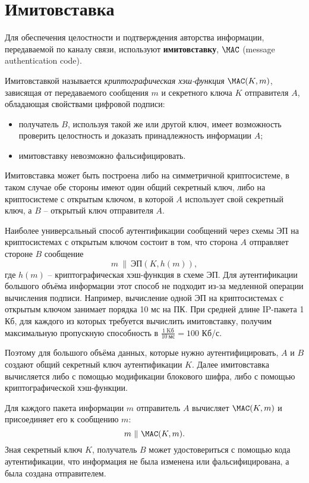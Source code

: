 \section{Имитовставка}\label{section-MAC}

Для обеспечения целостности и подтверждения авторства информации, передаваемой по каналу связи, используют \textbf{имитовставку}, $\MAC$ (message authentication code).

Имитовставкой называется \emph{криптографическая хэш-функция} $\MAC(K,m)$, зависящая от передаваемого сообщения $m$ и секретного ключа $K$ отправителя $A$, обладающая свойствами цифровой подписи:
\begin{itemize}
    \item получатель $B$, используя такой же или другой ключ, имеет возможность проверить целостность и доказать принадлежность информации $A$;
    \item имитовставку невозможно фальсифицировать.
\end{itemize}

Имитовставка может быть построена либо на симметричной криптосистеме, в таком случае обе стороны имеют один общий секретный ключ, либо на криптосистеме с открытым ключом, в которой $A$ использует свой секретный ключ, а $B$ -- открытый ключ отправителя $A$.

Наиболее универсальный способ аутентификации сообщений через схемы ЭП на криптосистемах с открытым ключом состоит в том, что сторона $A$ отправляет стороне $B$ сообщение
    \[ m ~\|~ \textrm{ЭП}(K, h(m)), \]
где $h(m)$ -- криптографическая хэш-функция в схеме ЭП. Для аутентификации большого объёма информации этот способ не подходит из-за медленной операции вычисления подписи. Например, вычисление одной ЭП на криптосистемах с открытым ключом занимает порядка 10 мс на ПК. При средней длине IP-пакета 1 Кб, для каждого из которых требуется вычислить имитовставку, получим максимальную пропускную способность в $\frac{1 ~ \text{Kб}}{10 ~ \text{мс}} = 100$ Кб/с.

Поэтому для большого объёма данных, которые нужно аутентифицировать, $A$ и $B$ создают общий секретный ключ аутентификации $K$. Далее имитовставка вычисляется либо с помощью модификации блокового шифра, либо с помощью криптографической хэш-функции.

Для каждого пакета информации $m$ отправитель $A$ вычисляет $\MAC(K,m)$ и присоединяет его к сообщению $m$:
    \[ m ~ \|~ \MAC(K,m). \]
Зная секретный ключ $K$, получатель $B$ может удостовериться с помощью кода аутентификации, что информация не была изменена или фальсифицирована, а была создана отправителем.

